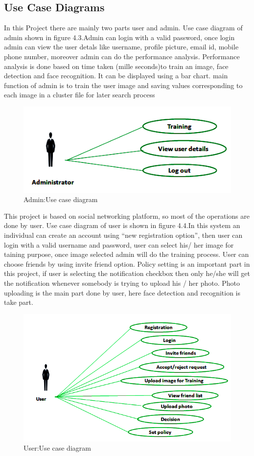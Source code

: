 \subsection[Use Case Diagrams]{Use Case Diagrams}
In this Project there are mainly two parts user and admin. Use case diagram  of admin shown in figure 4.3.Admin can login with a valid password, once login admin can view the user detals like username, profile picture, email id, mobile phone number, moreover admin can do the performance analysis. Performance analysis is done based on time taken (mille seconds)to train an  image, face detection and face recognition. It can be  displayed using a bar chart.  main function of admin is to train the user image and saving values corresponding to each image in a cluster file for later search process
\begin{figure}[H]
 \centering
  \includegraphics[scale=0.8]{au.png}
  \caption[Admin:Use Case Diagram]{Admin:Use case diagram}
  \label{pf}
\end{figure}
This project is based on social networking platform, so most of the operations are done by user. Use case diagram  of user is  shown in figure 4.4.In this system an  individual can create an account using “new registration option”, then user can login with a valid username and password, user can select his/ her image for taining purpose, once image selected admin will do the training process. User can choose friends by using invite friend option. Policy setting is an important part in this project, if user is selecting the notification checkbox then only he/she will get the notification whenever somebody is trying to upload his / her photo. Photo uploading is the main part done by user, here face detection and recognition is take part.
\begin{figure}[H]
 \centering
  \includegraphics[scale=0.8]{uu.png}
  \caption[User:Use Case Diagram]{User:Use case diagram}
  \label{pf}
\end{figure}
